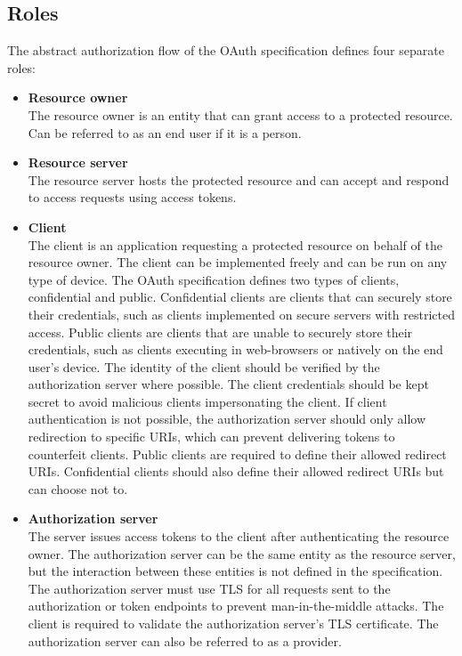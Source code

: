 \subsection{Roles}
The abstract authorization flow of the OAuth specification defines four separate roles:

\begin{itemize}    
    \item \textbf{Resource owner} \\
    The resource owner is an entity that can grant access to a protected resource. Can be referred to as an end user if it is a person.
    \item \textbf{Resource server} \\
    The resource server hosts the protected resource and can accept and respond to access requests using access tokens.
    \item \textbf{Client} \\
    The client is an application requesting a protected resource on behalf of the resource owner. The client can be implemented freely and can be run on any type of device.
    The OAuth specification defines two types of clients, confidential and public.
    Confidential clients are clients that can securely store their credentials, such as clients implemented on secure servers with restricted access.
    Public clients are clients that are unable to securely store their credentials, such as clients executing in web-browsers or natively on the end user's device.
    The identity of the client should be verified by the authorization server where possible.
    The client credentials should be kept secret to avoid malicious clients impersonating the client.
    If client authentication is not possible, the authorization server should only allow redirection to specific URIs, which can prevent delivering tokens to counterfeit clients.
    Public clients are required to define their allowed redirect URIs.
    Confidential clients should also define their allowed redirect URIs but can choose not to.
    \item \textbf{Authorization server} \\
    The server issues access tokens to the client after authenticating the resource owner. The authorization server can be the same entity as the resource server, but the interaction between these entities is not defined in the specification.
    The authorization server must use TLS for all requests sent to the authorization or token endpoints to prevent man-in-the-middle attacks.
    The client is required to validate the authorization server's TLS certificate.
    The authorization server can also be referred to as a provider.
\end{itemize}
